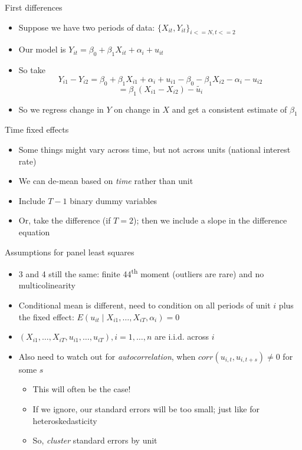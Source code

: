 \documentclass[aspectratio=169]{beamer}
\begin{document}
\begin{frame}{First differences}
    \begin{itemize}
        \item Suppose we have two periods of data: $\{X_{it},Y_{it} \}_{i<=N, t<=2}$
        \item Our model is $Y_{it} = \beta_0 + \beta_1 X_{it} + \alpha_i + u_{it}$
        \item So take 
        $$Y_{i1} - Y_{i2} = \beta_0 + \beta_1 X_{i1} + \alpha_i + u_{i1} - \beta_0 - \beta_1 X_{i2} - \alpha_i - u_{i2}$$
        $$ = \beta_1 (X_{i1}-X_{i2}) - \tilde{u_i}$$
        \item So we regress change in $Y$ on change in $X$ and get a consistent estimate of $\beta_1$
    \end{itemize}
\end{frame}

\begin{frame}{Time fixed effects}
    \begin{itemize}
        \item Some things might vary across time, but not across units (national interest rate)
        \item We can de-mean based on \textit{time} rather than unit
        \item Include $T-1$ binary dummy variables 
        \item Or, take the difference (if $T=2$); then we include a slope in the difference equation
    \end{itemize}
\end{frame}

\begin{frame}{Assumptions for panel least squares}
    \begin{itemize}
        \item 3 and 4 still the same: finite 44\textsuperscript{th} moment (outliers are rare) and no multicolinearity
        \item Conditional mean is different, need to condition on all periods of unit $i$ plus the fixed effect: $E\left(u_{i t} \mid X_{i 1}, \ldots, X_{i T}, \alpha_i\right)=0$
        \item $\left(X_{i 1}, \ldots, X_{i T}, u_{i 1}, \ldots, u_{i T}\right), i=1, \ldots, n$ are i.i.d. across $i$
        \item Also need to watch out for \textit{autocorrelation}, when $corr(u_{i,t},u_{i,t+s}) \neq 0$ for some $s$
        \begin{itemize}
            \item This will often be the case!
            \item If we ignore, our standard errors will be too small; just like for heteroskedasticity
            \item So, \textit{cluster} standard errors by unit
        \end{itemize}
    \end{itemize}
\end{frame}
\end{document}
